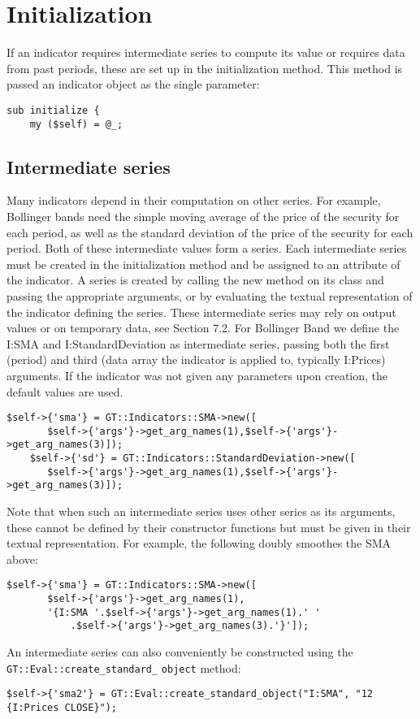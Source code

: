 \documentclass[11pt,twoside]{article}
\begin{document}
\section{Initialization}
If an indicator requires intermediate series to compute its value or
requires data from past periods, these are set up in the initialization
method. This method is passed an indicator object as the single
parameter:

\begin{lstlisting}[name=example]
sub initialize {
    my ($self) = @_;
\end{lstlisting}

\subsection[Intermediate series]{Intermediate series}
Many indicators depend in their computation on other series. For
example, Bollinger bands need the simple moving average of the price of
the security for each period, as well as the standard deviation of the
price of the security for each period. Both of these intermediate
values form a series. Each intermediate series must be created in the
initialization method and be assigned to an attribute of the indicator.
A series is created by calling the new method on its class and passing
the appropriate arguments, or by evaluating the textual representation
of the indicator defining the series. These intermediate series may
rely on output values or on temporary data, see Section 7.2. For
Bollinger Band we define the I:SMA and I:StandardDeviation as
intermediate series, passing both the first (period) and third (data
array the indicator is applied to, typically I:Prices) arguments. If
the indicator was not given any parameters upon creation, the default
values are used.

\begin{lstlisting}[name=example]
    $self->{'sma'} = GT::Indicators::SMA->new([
       $self->{'args'}->get_arg_names(1),$self->{'args'}->get_arg_names(3)]);
    $self->{'sd'} = GT::Indicators::StandardDeviation->new([
       $self->{'args'}->get_arg_names(1),$self->{'args'}->get_arg_names(3)]);
\end{lstlisting}
Note that when such an intermediate series uses other series as its arguments,
these cannot be defined by their constructor functions but must be given
in their textual representation. For example, the following doubly smoothes
the SMA above:
\begin{lstlisting}[numbers=none]
    $self->{'sma'} = GT::Indicators::SMA->new([
       $self->{'args'}->get_arg_names(1), 
       '{I:SMA '.$self->{'args'}->get_arg_names(1).' '
           .$self->{'args'}->get_arg_names(3).'}']);
\end{lstlisting}
An intermediate series can also conveniently be constructed using the \lstinline!GT::Eval::create_standard_! \lstinline!object! method:
\begin{lstlisting}[numbers=none]
$self->{'sma2'} = GT::Eval::create_standard_object("I:SMA", "12 {I:Prices CLOSE}");
\end{lstlisting}
\end{document}
